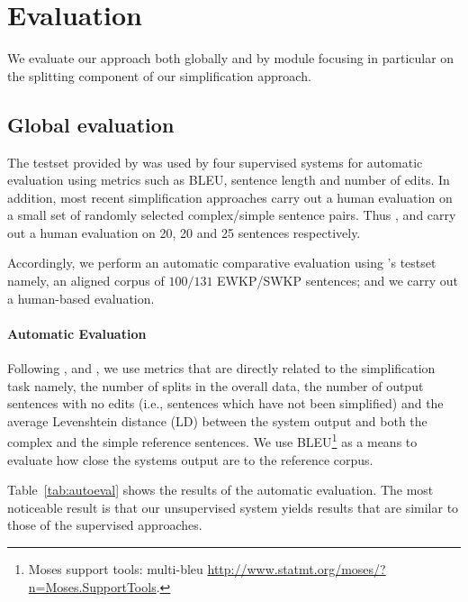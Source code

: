 \documentclass[11pt,a4paper]{article}
\begin{document}
\section{Evaluation}
\label{sec:xps}

We evaluate our approach both globally and by module focusing in
particular on the splitting component of our simplification approach.

\subsection{Global evaluation}

The testset provided by  was used by four
supervised systems for automatic evaluation using metrics such as
BLEU, sentence length and number of edits. In addition, most recent
simplification approaches carry out a human evaluation on a small set
of randomly selected complex/simple sentence pairs. Thus
,  and
 carry out a human evaluation on
20, 20 and 25 sentences respectively.

Accordingly, we perform an automatic comparative evaluation using
\cite{zhu2010monolingual}'s testset namely, an aligned corpus of
$100/131$ EWKP/SWKP sentences; and we carry out a human-based
evaluation.





\paragraph{Automatic Evaluation}

Following , 
and , we use metrics that are directly
related to the simplification task namely, the number of splits in the
overall data, the number of output sentences with no edits (i.e.,
sentences which have not been simplified) and the average Levenshtein
distance (LD) between the system output and both the complex and the
simple reference sentences. We use BLEU\footnote{Moses support tools:
  multi-bleu \url{http://www.statmt.org/moses/?n=Moses.SupportTools}.}
as a means to evaluate how close the systems output are to the
reference corpus.

Table~\ref{tab:autoeval} shows the results of the automatic
evaluation.  The most noticeable result is that our unsupervised
system yields results that are similar to those of the supervised
approaches. 
\end{document}
